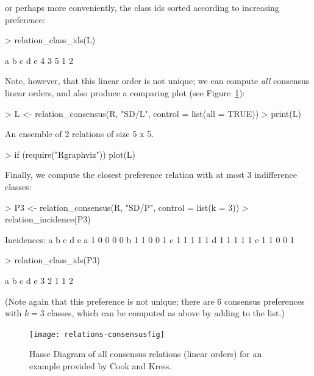 \documentclass[fleqn]{article}
\begin{document}
or perhaps more conveniently, the class ids sorted according to
increasing preference:
\begin{Schunk}
\begin{Sinput}
> relation_class_ids(L)
\end{Sinput}
\begin{Soutput}
a b c d e 
4 3 5 1 2 
\end{Soutput}
\end{Schunk}
Note, however, that this linear order is not unique; we can compute
\emph{all} consensus linear orders, and also produce a comparing plot
(see Figure~\ref{fig:plot2}):
\begin{Schunk}
\begin{Sinput}
> L <- relation_consensus(R, "SD/L", control = list(all = TRUE))
> print(L)
\end{Sinput}
\begin{Soutput}
An ensemble of 2 relations of size 5 x 5.
\end{Soutput}
\begin{Sinput}
> if (require("Rgraphviz")) plot(L)
\end{Sinput}
\end{Schunk}
Finally, we compute the closest preference relation with at most 3
indifference classes:
\begin{Schunk}
\begin{Sinput}
> P3 <- relation_consensus(R, "SD/P", control = list(k = 3))
> relation_incidence(P3)
\end{Sinput}
\begin{Soutput}
Incidences:
  a b c d e
a 1 0 0 0 0
b 1 1 0 0 1
c 1 1 1 1 1
d 1 1 1 1 1
e 1 1 0 0 1
\end{Soutput}
\begin{Sinput}
> relation_class_ids(P3)
\end{Sinput}
\begin{Soutput}
a b c d e 
3 2 1 1 2 
\end{Soutput}
\end{Schunk}
(Note again that this preference is not unique; there are 6 consensus
preferences with $k = 3$ classes, which can be computed as above by
adding  to the  list.)

\begin{figure}[h]
\begin{center}
\texttt{[image: relations-consensusfig]}
\caption{Hasse Diagram of all consensus relations (linear orders) for an
  example provided by Cook and Kress.}
\label{fig:plot2}
\end{center}
\end{figure}
\end{document}

